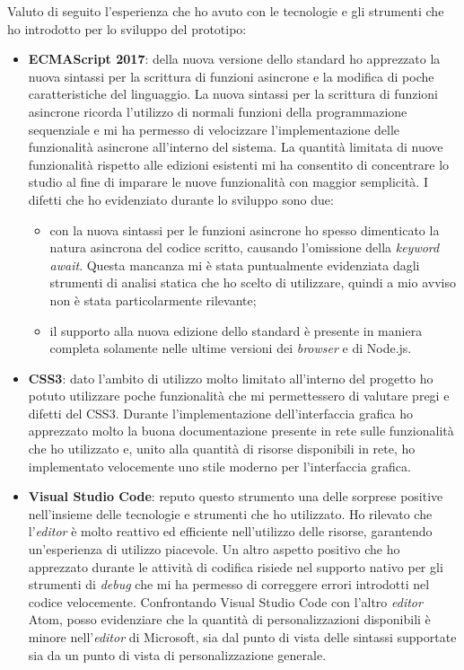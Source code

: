 Valuto di seguito l'esperienza che ho avuto con le tecnologie e gli strumenti che ho introdotto per lo sviluppo del prototipo:
\begin{itemize}
  \item \textbf{ECMAScript 2017}: della nuova versione dello standard ho apprezzato la nuova sintassi per la scrittura di funzioni asincrone e la modifica di poche caratteristiche del linguaggio. La nuova sintassi per la scrittura di funzioni asincrone ricorda l'utilizzo di normali funzioni della programmazione sequenziale e mi ha permesso di velocizzare l'implementazione delle funzionalità asincrone all'interno del sistema. La quantità limitata di nuove funzionalità rispetto alle edizioni esistenti mi ha consentito di concentrare lo studio al fine di imparare le nuove funzionalità con maggior semplicità. I difetti che ho evidenziato durante lo sviluppo sono due:
  \begin{itemize}
    \item con la nuova sintassi per le funzioni asincrone ho spesso dimenticato la natura asincrona del codice scritto, causando l'omissione della \emph{keyword} \emph{await}. Questa mancanza mi è stata puntualmente evidenziata dagli strumenti di analisi statica che ho scelto di utilizzare, quindi a mio avviso non è stata particolarmente rilevante;
    \item il supporto alla nuova edizione dello standard è presente in maniera completa solamente nelle ultime versioni dei \emph{browser} e di Node.js.\footnotemark
  \end{itemize}
  \item \textbf{CSS3}: dato l'ambito di utilizzo molto limitato all'interno del progetto ho potuto utilizzare poche funzionalità che mi permettessero di valutare pregi e difetti del CSS3. Durante l'implementazione dell'interfaccia grafica ho apprezzato molto la buona documentazione presente in rete sulle funzionalità che ho utilizzato e, unito alla quantità di risorse disponibili in rete, ho implementato velocemente uno stile moderno per l'interfaccia grafica.
  \item \textbf{Visual Studio Code}: reputo questo strumento una delle sorprese positive nell'insieme delle tecnologie e strumenti che ho utilizzato. Ho rilevato che l'\emph{editor} è molto reattivo ed efficiente nell'utilizzo delle risorse, garantendo un'esperienza di utilizzo piacevole. Un altro aspetto positivo che ho apprezzato durante le attività di codifica risiede nel supporto nativo per gli strumenti di \emph{debug} che mi ha permesso di correggere errori introdotti nel codice velocemente. Confrontando Visual Studio Code con l'altro \emph{editor} Atom, posso evidenziare che la quantità di personalizzazioni disponibili è minore nell'\emph{editor} di Microsoft, sia dal punto di vista delle sintassi supportate sia da un punto di vista di personalizzazione generale.

\end{itemize}
